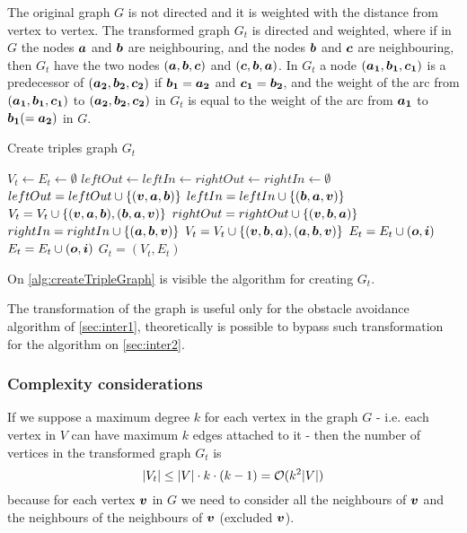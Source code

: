 \documentclass[dissertation.tex]{subfiles}
\begin{document}
The original graph $G$ is not directed and it is weighted
with the distance from vertex to vertex. The transformed graph $G_t$ is
directed and weighted, where if in $G$ the nodes $\boldsymbol{a}$
and $\boldsymbol{b}$ are
neighbouring, and the nodes $\boldsymbol{b}$ and $\boldsymbol{c}$ are neighbouring, then $G_t$
have the two nodes $(\boldsymbol{a},\boldsymbol{b},\boldsymbol{c})$ and $(\boldsymbol{c},\boldsymbol{b},\boldsymbol{a})$. In
$G_t$ a node $(\boldsymbol{a_1},\boldsymbol{b_1},\boldsymbol{c_1})$ is a predecessor of
$(\boldsymbol{a_2},\boldsymbol{b_2},\boldsymbol{c_2})$ if $\boldsymbol{b_1}=\boldsymbol{a_2}$ and $\boldsymbol{c_1}=\boldsymbol{b_2}$, and the weight of the arc
from $(\boldsymbol{a_1},\boldsymbol{b_1},\boldsymbol{c_1})$ to $(\boldsymbol{a_2},\boldsymbol{b_2},\boldsymbol{c_2})$ in $G_t$ is
equal to
the weight of the arc from $\boldsymbol{a_1}$ to $\boldsymbol{b_1}(=\boldsymbol{a_2})$ in $G$.

\begin{algorithm}
 \caption{Create triples graph $G_t$}\label{alg:createTripleGraph}
 \begin{algorithmic}[1]
   \State $V_t\gets E_t\gets \emptyset$
   \label{ln:tripleFor0}
   \State $leftOut\gets leftIn\gets rightOut\gets rightIn\gets \emptyset$
   \State $leftOut = leftOut\cup \{(\boldsymbol{v},\boldsymbol{a},\boldsymbol{b})\}$
   \State $leftIn = leftIn\cup \{(\boldsymbol{b},\boldsymbol{a},\boldsymbol{v})\}$
   \State $V_t = V_t\cup \{(\boldsymbol{v},\boldsymbol{a},\boldsymbol{b}), (\boldsymbol{b},\boldsymbol{a},\boldsymbol{v})\}$
   \EndFor
   \State $rightOut = rightOut\cup \{(\boldsymbol{v},\boldsymbol{b},\boldsymbol{a})\}$
   \State $rightIn = rightIn\cup \{(\boldsymbol{a},\boldsymbol{b},\boldsymbol{v})\}$
   \State $V_t = V_t\cup \{(\boldsymbol{v},\boldsymbol{b},\boldsymbol{a}), (\boldsymbol{a},\boldsymbol{b},\boldsymbol{v})\}$
   \EndFor
   \State $E_t = E_t\cup (\boldsymbol{o},\boldsymbol{i})$
   \EndFor
   \EndFor
   \label{ln:tripleFor1}
   \label{ln:tripleFor2}
   \State $E_t = E_t\cup (\boldsymbol{o},\boldsymbol{i})$
   \EndFor
   \EndFor
   \EndFor
   \State\Return $G_t=(V_t,E_t)$
   \EndProcedure
 \end{algorithmic}
\end{algorithm}
On \cref{alg:createTripleGraph} is visible the algorithm for creating
$G_t$.

The transformation of the graph is useful only for the obstacle
avoidance algorithm of
\cref{sec:inter1}, theoretically is possible to bypass such
transformation for the algorithm on \cref{sec:inter2}.

\subsubsection{Complexity considerations}
If we suppose a maximum degree $k$ for each vertex in the graph $G$ -
i.e. each vertex in $V$ can have maximum $k$ edges attached to
it - then the number of vertices in the transformed graph $G_t$ is 
\begin{equation}
  \label{eq:numTriples}
  |V_t|\leq |V|\cdot k\cdot(k-1)=\mathcal{O}(k^2|V|)
\end{equation}
because for each vertex $\boldsymbol{v}$ in $G$ we need to
consider all the neighbours of $\boldsymbol{v}$ and the neighbours of the neighbours
of $\boldsymbol{v}$ (excluded $\boldsymbol{v}$).
\end{document}
